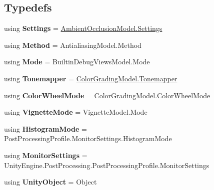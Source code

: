 \subsection*{Typedefs}
\begin{DoxyCompactItemize}
\item 
\mbox{\label{namespace_unity_editor_1_1_post_processing_a03001cf2f893137ef8a9a57054900164}} 
using {\bfseries Settings} = \hyperlink{struct_unity_engine_1_1_post_processing_1_1_ambient_occlusion_model_1_1_settings}{Ambient\+Occlusion\+Model.\+Settings}
\item 
\mbox{\label{namespace_unity_editor_1_1_post_processing_a8c5d7ed72ff766fc95143da7fa5cb899}} 
using {\bfseries Method} = Antialiasing\+Model.\+Method
\item 
\mbox{\label{namespace_unity_editor_1_1_post_processing_a65c49c112e4eb37c811fa57a275231e9}} 
using {\bfseries Mode} = Builtin\+Debug\+Views\+Model.\+Mode
\item 
\mbox{\label{namespace_unity_editor_1_1_post_processing_ac4098a7d6a3538137148a2dd090eef8a}} 
using {\bfseries Tonemapper} = \hyperlink{class_unity_engine_1_1_post_processing_1_1_color_grading_model_a4955bb9dfed7e27c93e7493ff66f3de6}{Color\+Grading\+Model.\+Tonemapper}
\item 
\mbox{\label{namespace_unity_editor_1_1_post_processing_a63f4093c3b80718adbcf05d8ac53ba78}} 
using {\bfseries Color\+Wheel\+Mode} = Color\+Grading\+Model.\+Color\+Wheel\+Mode
\item 
\mbox{\label{namespace_unity_editor_1_1_post_processing_af7f8f737bc5127e50777057373b55b6b}} 
using {\bfseries Vignette\+Mode} = Vignette\+Model.\+Mode
\item 
\mbox{\label{namespace_unity_editor_1_1_post_processing_abf1f5783b507b47d86d7eca6d02358b3}} 
using {\bfseries Histogram\+Mode} = Post\+Processing\+Profile.\+Monitor\+Settings.\+Histogram\+Mode
\item 
\mbox{\label{namespace_unity_editor_1_1_post_processing_a1406720dd4f22de1ae4d53487f0701d9}} 
using {\bfseries Monitor\+Settings} = Unity\+Engine.\+Post\+Processing.\+Post\+Processing\+Profile.\+Monitor\+Settings
\item 
\mbox{\label{namespace_unity_editor_1_1_post_processing_ad423241489697fa1f651c396ddfe07b8}} 
using {\bfseries Unity\+Object} = Object
\end{DoxyCompactItemize}
